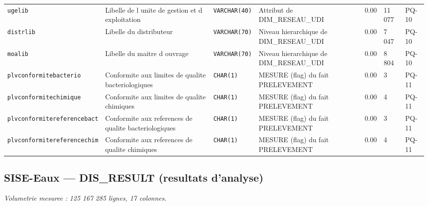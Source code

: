 {\begin{longtable}{@{}p{2.6cm}p{3.5cm}p{1.9cm}p{3.1cm}p{1.1cm}p{1.3cm}p{0.9cm}@{}}
\texttt{ugelib} & Libelle de l unite de gestion et d exploitation & \texttt{VARCHAR(40)} & Attribut de DIM\_RESEAU\_UDI & 0.00 & 11 077 & PQ-10 \\
\texttt{distrlib} & Libelle du distributeur & \texttt{VARCHAR(70)} & Niveau hierarchique de DIM\_RESEAU\_UDI & 0.00 & 7 047 & PQ-10 \\
\texttt{moalib} & Libelle du maitre d ouvrage & \texttt{VARCHAR(70)} & Niveau hierarchique de DIM\_RESEAU\_UDI & 0.00 & 8 804 & PQ-10 \\
\texttt{plvconformitebacterio} & Conformite aux limites de qualite bacteriologiques & \texttt{CHAR(1)} & MESURE (flag) du fait PRELEVEMENT & 0.00 & 3 & PQ-11 \\
\texttt{plvconformitechimique} & Conformite aux limites de qualite chimiques & \texttt{CHAR(1)} & MESURE (flag) du fait PRELEVEMENT & 0.00 & 4 & PQ-11 \\
\texttt{plvconformitereferencebact} & Conformite aux references de qualite bacteriologiques & \texttt{CHAR(1)} & MESURE (flag) du fait PRELEVEMENT & 0.00 & 3 & PQ-11 \\
\texttt{plvconformitereferencechim} & Conformite aux references de qualite chimiques & \texttt{CHAR(1)} & MESURE (flag) du fait PRELEVEMENT & 0.00 & 4 & PQ-11 \\
\end{longtable}}

\subsection{SISE-Eaux --- DIS\_RESULT (resultats d'analyse)}
\noindent\textit{Volumetrie mesuree : 125 167 285 lignes, 17 colonnes.}\par\smallskip

